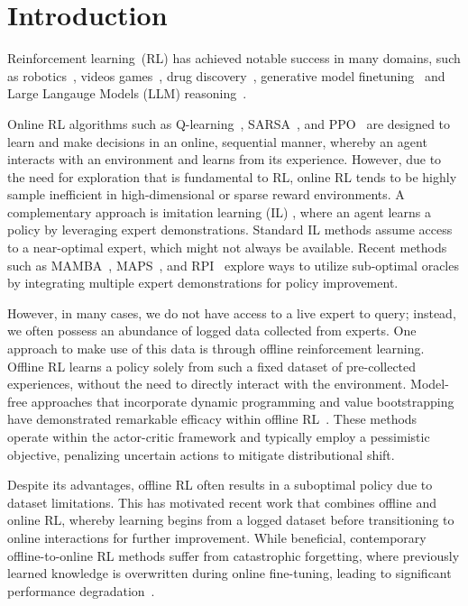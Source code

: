\section{Introduction}


Reinforcement learning~(RL) has achieved notable success in many domains, such as robotics~\citep{kober2011reinforcement,kober2013reinforcement}, videos games~\citep{mnih2013playing}, drug discovery~\citep{liu2024entropy}, generative model finetuning~\citep{touvron2023llama,liu2023drugimprover} and Large Langauge Models (LLM) reasoning~\citep{havrilla2024teaching}.



Online RL algorithms such as Q-learning~\citep{watkins1989learning}, SARSA~\citep{rummery1994line}, and PPO~\citep{schulman2017proximal} are designed to learn and make decisions in an online, sequential manner, whereby an agent interacts with an environment and learns from its experience. However, due to the need for exploration that is fundamental to RL, online RL tends to be highly sample inefficient in high-dimensional or sparse reward environments. 
A complementary approach is imitation learning (IL) \citep{ross2010efficient,ross2014reinforcement}, where an agent learns a policy by leveraging expert demonstrations.
Standard IL methods assume access to a near-optimal expert, which might not always be available. Recent methods such as MAMBA~\citep{cheng2020policy}, MAPS~\citep{liu2023active}, and RPI~\citep{liu2023blending} explore ways to utilize sub-optimal oracles by integrating multiple expert demonstrations for policy improvement.

However, in many cases, we do not have access to a live expert to query; instead, we often possess an abundance of logged data collected from experts. One approach to make use of this data is through offline reinforcement learning. Offline RL learns a policy solely from such a fixed dataset of pre-collected experiences, without the need to directly interact with the environment. Model-free approaches that incorporate dynamic programming and value bootstrapping have demonstrated remarkable efficacy within offline RL~\citep{fujimoto2019off,kumar2020conservative,fujimoto2021minimalist,kostrikov2021offline}. 
These methods operate within the actor-critic framework and typically employ a pessimistic objective, penalizing uncertain actions to mitigate distributional shift.

Despite its advantages, offline RL often results in a suboptimal policy due to dataset limitations. This has motivated recent work that combines offline and online RL, whereby %
learning begins from a logged dataset before transitioning to online interactions for further improvement. %
While beneficial, contemporary offline-to-online RL methods suffer from catastrophic forgetting, where previously learned knowledge is overwritten during online fine-tuning, leading to significant performance degradation~\citep{luo2023finetuning}.





